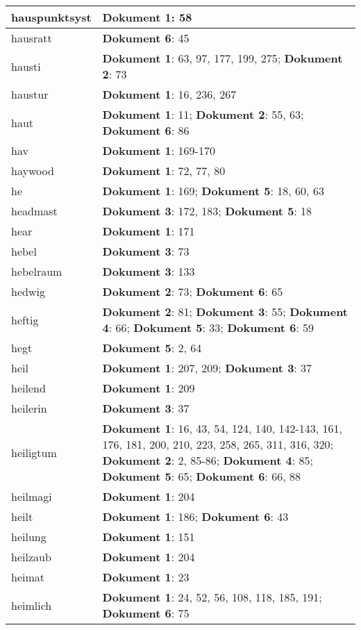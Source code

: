 \documentclass[a5paper]{article}
\begin{document}
\begin{longtable}[l]{|l|p{3in}|}
\hline
hauspunktsyst & \textbf{Dokument 1}: 58 \\
\hline
hausratt & \textbf{Dokument 6}: 45 \\
\hline
hausti & \textbf{Dokument 1}: 63, 97, 177, 199, 275; \textbf{Dokument 2}: 73 \\
\hline
haustur & \textbf{Dokument 1}: 16, 236, 267 \\
\hline
haut & \textbf{Dokument 1}: 11; \textbf{Dokument 2}: 55, 63; \textbf{Dokument 6}: 86 \\
\hline
hav & \textbf{Dokument 1}: 169-170 \\
\hline
haywood & \textbf{Dokument 1}: 72, 77, 80 \\
\hline
he & \textbf{Dokument 1}: 169; \textbf{Dokument 5}: 18, 60, 63 \\
\hline
headmast & \textbf{Dokument 3}: 172, 183; \textbf{Dokument 5}: 18 \\
\hline
hear & \textbf{Dokument 1}: 171 \\
\hline
hebel & \textbf{Dokument 3}: 73 \\
\hline
hebelraum & \textbf{Dokument 3}: 133 \\
\hline
hedwig & \textbf{Dokument 2}: 73; \textbf{Dokument 6}: 65 \\
\hline
heftig & \textbf{Dokument 2}: 81; \textbf{Dokument 3}: 55; \textbf{Dokument 4}: 66; \textbf{Dokument 5}: 33; \textbf{Dokument 6}: 59 \\
\hline
hegt & \textbf{Dokument 5}: 2, 64 \\
\hline
heil & \textbf{Dokument 1}: 207, 209; \textbf{Dokument 3}: 37 \\
\hline
heilend & \textbf{Dokument 1}: 209 \\
\hline
heilerin & \textbf{Dokument 3}: 37 \\
\hline
heiligtum & \textbf{Dokument 1}: 16, 43, 54, 124, 140, 142-143, 161, 176, 181, 200, 210, 223, 258, 265, 311, 316, 320; \textbf{Dokument 2}: 2, 85-86; \textbf{Dokument 4}: 85; \textbf{Dokument 5}: 65; \textbf{Dokument 6}: 66, 88 \\
\hline
heilmagi & \textbf{Dokument 1}: 204 \\
\hline
heilt & \textbf{Dokument 1}: 186; \textbf{Dokument 6}: 43 \\
\hline
heilung & \textbf{Dokument 1}: 151 \\
\hline
heilzaub & \textbf{Dokument 1}: 204 \\
\hline
heimat & \textbf{Dokument 1}: 23 \\
\hline
heimlich & \textbf{Dokument 1}: 24, 52, 56, 108, 118, 185, 191; \textbf{Dokument 6}: 75 \\

\end{longtable}
\end{document}

